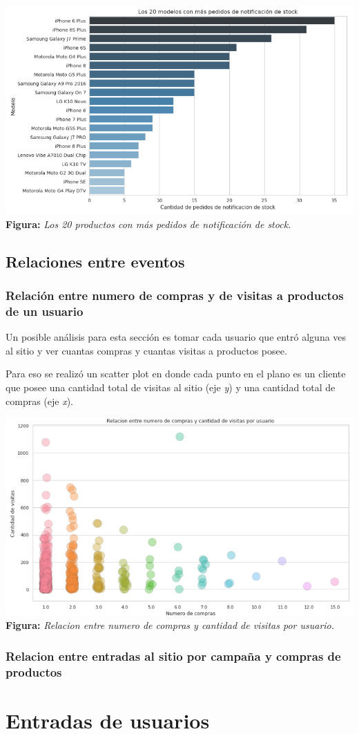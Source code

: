 \documentclass[titlepage,a4paper]{article}
\begin{document}
  \begin{center}
   \includegraphics[width=14cm]{imagenes/top20lead.jpg}\\
	\textbf{Figura:}  \textit{Los 20 productos con más pedidos de notificación de stock.}
	\end{center}
  
 
 \subsection{Relaciones entre eventos}

  \subsubsection{Relación entre numero de compras y de visitas a productos de un usuario}
  
  Un posible análisis para esta sección es tomar cada usuario que entró alguna ves al sitio y ver cuantas compras y cuantas visitas a productos posee.
  
  Para eso se realizó un scatter plot en donde cada punto en el plano es un cliente que posee una cantidad total de visitas al sitio (eje \textit{y}) y una cantidad total de compras (eje  \textit{x}).
  
  \begin{center}
   \includegraphics[width=14cm]{imagenes/comprasVsVisitas.jpg}\\
	\textbf{Figura:}  \textit{Relacion entre numero de compras y cantidad de visitas por usuario.}
	\end{center}
	
	
  \subsubsection{Relacion entre entradas al sitio por campaña y compras de productos}

  \section{Entradas de usuarios}
\end{document}
